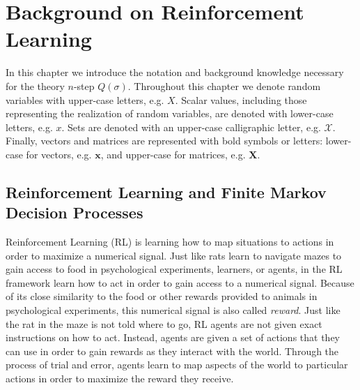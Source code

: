 \providecommand{\main}{..}


\chapter{Background on Reinforcement Learning}
\label{ch2:background}

In this chapter we introduce the notation and background knowledge necessary for the theory $n$-step $Q(\sigma)$. 
Throughout this chapter we denote random variables with upper-case letters, e.g. $X$. 
Scalar values, including those representing the realization of random variables, are denoted with lower-case letters, e.g. $x$.
Sets are denoted with an upper-case calligraphic letter, e.g. $\mathcal{X}$. 
Finally, vectors and matrices are represented with bold symbols or letters: lower-case for vectors, e.g. $\textbf{x}$, and upper-case for matrices, e.g. $\textbf{X}$.

\section{Reinforcement Learning and Finite Markov Decision Processes}

Reinforcement Learning (RL) is learning how to map situations to actions in order to maximize a numerical signal.
Just like rats learn to navigate mazes to gain access to food in psychological experiments, learners, or agents,  in the RL framework learn how to act in order to gain access to a numerical signal. 
Because of its close similarity to the food or other rewards provided to animals in psychological experiments, this numerical signal is also called \textit{reward}. 
Just like the rat in the maze is not told where to go, RL agents are not given exact instructions on how to act.
Instead, agents are given a set of actions that they can use in order to gain rewards as they interact with the world.
Through the process of trial and error, agents learn to map aspects of the world to particular actions in order to maximize the reward they receive.

